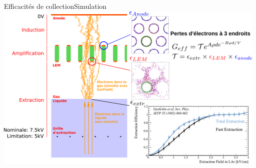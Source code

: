     \begin{frame}{Efficacités de collection}{Simulation}
		\includegraphics[width=\textwidth]{./pictures/coll_proba_2.pdf}
    \end{frame}
    
